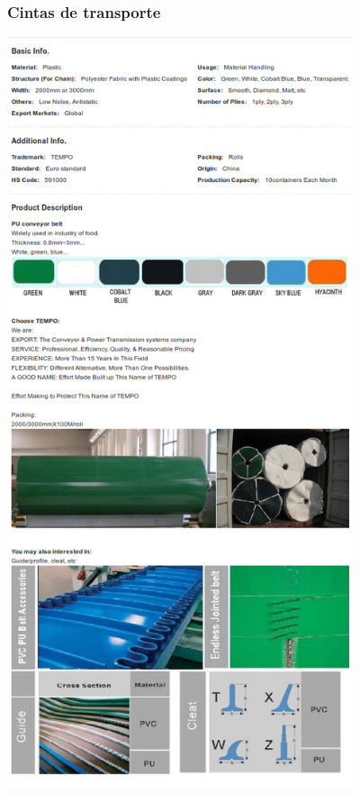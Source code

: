 \subsubsection{Cintas de transporte}
\includegraphics[height=22cm,keepaspectratio]{Datasheets/11Cinta.png} 
\newpage
